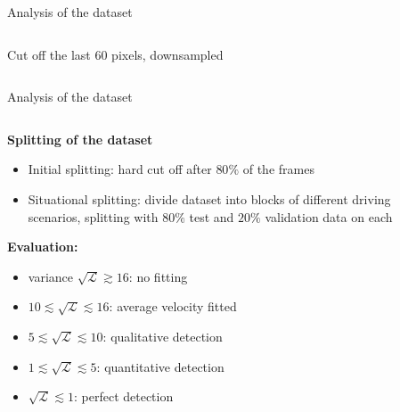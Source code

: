\begin{frame}{Analysis of the dataset}
\begin{columns}[t]
\begin{column}{.45\textwidth}
\begin{center}
				\small{Cut off the last 60 pixels, downsampled}
			\end{center}
		\end{column}
	\end{columns}
\end{frame}

\begin{frame}{Analysis of the dataset}
	\begin{columns}[c]
		\begin{column}{.55\textwidth}
			\textbf{Splitting of the dataset}
			\begin{itemize}
				\item<+-> Initial splitting: hard cut off after $80\%$ of the frames
				\item<+-> Situational splitting: divide dataset into blocks of different driving scenarios,
				splitting with $80\%$ test and $20\%$ validation data on each
			\end{itemize}
			\pause
			\textbf{Evaluation:}
			\begin{itemize}
				\item<+-> variance $\sqrt{\mathcal{L}} \gtrsim 16$: no fitting
				\item<+-> $10 \lesssim \sqrt{\mathcal{L}} \lesssim 16$: average velocity fitted
				\item<+-> $5 \lesssim \sqrt{\mathcal{L}} \lesssim 10$: qualitative detection
				\item<+-> $1 \lesssim \sqrt{\mathcal{L}} \lesssim 5$: quantitative detection
				\item<+-> $\sqrt{\mathcal{L}} \lesssim 1$: perfect detection
			\end{itemize}
		\end{column}
		\begin{column}{.45\textwidth}
			\begin{center}
\end{center}
\end{column}
\end{columns}
\end{frame}
